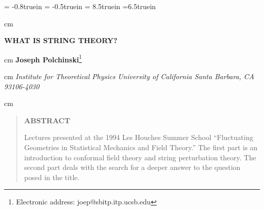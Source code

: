 
\voffset = -0.8truein
\hoffset = -0.5truein
\textheight = 8.5truein
\textwidth=6.5truein
\overfullrule=0pt
\parskip=10pt
\lineskip=6.0pt
\lineskiplimit=6.0pt
\renewcommand\topfraction{.85}
\renewcommand\bottomfraction{.4}
\renewcommand\textfraction{.15}
\renewcommand\floatpagefraction{.8}

\def\roughly#1{\raise.3ex\hbox{$#1$\kern-.75em\lower1ex\hbox{$\sim$}}}
\newcommand{\bra}[1]{\mbox{$\langle #1 $}}
\newcommand{\ket}[1]{\mbox{$| #1 \rangle$}}
\newcommand{\subs}[1]{\subsection{#1}\setcounter{equation}{0}}
\def\theequation{\thesubsection.\arabic{equation}}



\thispagestyle{empty}

 cm

\begin{center}
{\large\bf WHAT IS STRING THEORY?} \break

 cm
{\bf Joseph Polchinski}\footnote{Electronic address:
joep@sbitp.itp.ucsb.edu}

 cm
\sl
Institute for Theoretical Physics  \break
University of California  \break
Santa Barbara, CA 93106-4030  \break

\end{center}
 cm
\rm

\begin{quote}
\begin{center}
{\bf ABSTRACT}
\end{center}
Lectures presented at
the 1994 Les Houches Summer School ``Fluctuating Geometries in
Statistical Mechanics and Field Theory.''  The first part is an
introduction to conformal field theory and string perturbation theory. 
The second part deals with the search for a deeper answer to the
question posed in the title.
\end{quote}
\vskip1cm

\normalsize

\newpage
\tableofcontents
\newpage

